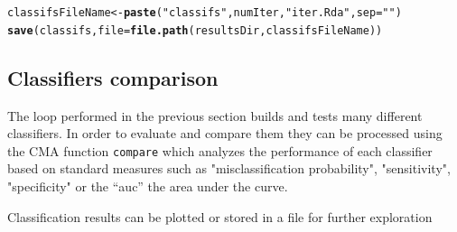 \documentclass{article}\usepackage[]{graphicx}\usepackage[]{color}
\makeatletter
\newcommand{\hlstr}[1]{\textcolor[rgb]{0.192,0.494,0.8}{#1}}%
\newcommand{\hlstd}[1]{\textcolor[rgb]{0.345,0.345,0.345}{#1}}%
\newcommand{\hlkwb}[1]{\textcolor[rgb]{0.69,0.353,0.396}{#1}}%
\newcommand{\hlkwc}[1]{\textcolor[rgb]{0.333,0.667,0.333}{#1}}%
\newcommand{\hlkwd}[1]{\textcolor[rgb]{0.737,0.353,0.396}{\textbf{#1}}}%
\newenvironment{kframe}{%
 \def\at@end@of@kframe{}%
 \ifinner\ifhmode%
  \def\at@end@of@kframe{\end{minipage}}%
  \begin{minipage}{\columnwidth}%
 \fi\fi%
 \def\FrameCommand##1{\hskip\@totalleftmargin \hskip-\fboxsep
 \colorbox{shadecolor}{##1}\hskip-\fboxsep
     \hskip-\linewidth \hskip-\@totalleftmargin \hskip\columnwidth}%
 \MakeFramed {\advance\hsize-\width
   \@totalleftmargin\z@ \linewidth\hsize
   \@setminipage}}%
 {\par\unskip\endMakeFramed%
 \at@end@of@kframe}
\newenvironment{knitrout}{}{} %
\makeatother
\begin{document}
\begin{knitrout}
\begin{kframe}
\begin{alltt}
\hlstd{classifsFileName} \hlkwb{<-} \hlkwd{paste}\hlstd{(}\hlstr{"classifs"}\hlstd{,numIter,}\hlstr{"iter.Rda"}\hlstd{,} \hlkwc{sep}\hlstd{=}\hlstr{""}\hlstd{)}
\hlkwd{save}\hlstd{(classifs,} \hlkwc{file}\hlstd{=}\hlkwd{file.path}\hlstd{(resultsDir,classifsFileName))}
\end{alltt}
\end{kframe}
\end{knitrout}

\subsection{Classifiers comparison}

The loop performed in the previous section builds and tests many different classifiers. In order to evaluate and compare them they can be processed using the CMA function \texttt{compare} which analyzes the performance of each classifier based on standard measures such as "misclassification probability", "sensitivity", "specificity" or the ``auc'' the area under the curve.

Classification results can be plotted or stored in a file for further exploration
\end{document}
